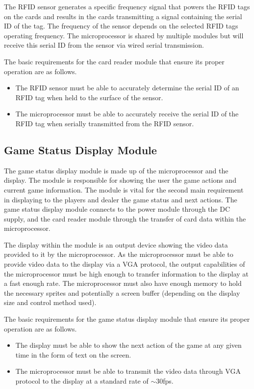 \documentclass[12pt]{article}
\begin{document}
The RFID sensor generates a specific frequency signal that powers the RFID tags on the cards and results in the cards transmitting a signal containing the serial ID of the tag. The frequency of the sensor depends on the selected RFID tags operating frequency. The microprocessor is shared by multiple modules but will receive this serial ID from the sensor via wired serial transmission.

The basic requirements for the card reader module that ensure its proper operation are as follows.

\begin{itemize}
\item The RFID sensor must be able to accurately determine the serial ID of an RFID tag when held to the surface of the sensor.
\item The microprocessor must be able to accurately receive the serial ID of the RFID tag when serially transmitted from the RFID sensor.
\end{itemize} 

\subsection{Game Status Display Module}

The game status display module is made up of the microprocessor and the display. The module is responsible for showing the user the game actions and current game information. The module is vital for the second main requirement in displaying to the players and dealer the game status and next actions. The game status display module connects to the power module through the DC supply, and the card reader module through the transfer of card data within the microprocessor.

The display within the module is an output device showing the video data provided to it by the microprocessor. As the microprocessor must be able to provide video data to the display via a VGA protocol, the output capabilities of the microprocessor must be high enough to transfer information to the display at a fast enough rate. The microprocessor must also have enough memory to hold the necessary sprites and potentially a screen buffer (depending on the display size and control method used).

The basic requirements for the game status display module that ensure its proper operation are as follows.

\begin{itemize}
\item The display must be able to show the next action of the game at any given time in the form of text on the screen.
\item The microprocessor must be able to transmit the video data through VGA protocol to the display at a standard rate of $\sim30$fps.
\end{itemize}
\end{document}
